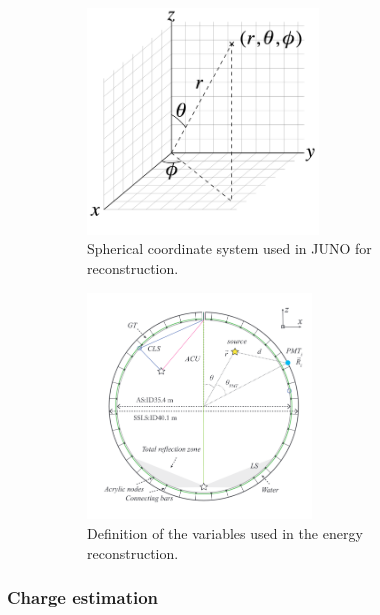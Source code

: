\documentclass[../main.tex]{subfiles}
\begin{document}
\begin{figure}[ht]
  \begin{subfigure}[b]{0.48\linewidth}
    \centering
    \includegraphics[height=6cm]{images/juno/spherical_coordinate_system.png}
    \caption{Spherical coordinate system used in JUNO for reconstruction.}
    \label{fig:juno:rec:corrdinate_system}
  \end{subfigure}
  \hfill
  \begin{subfigure}[b]{0.48\linewidth}
    \centering
    \includegraphics[height=6cm]{images/juno/reco/energy_reco_vars.png}
    \caption{Definition of the variables used in the energy reconstruction.}
    \label{fig:juno:rec:energy_vars}
  \end{subfigure}
  \caption{}
\end{figure}

\subsubsection{Charge estimation}
\end{document}
